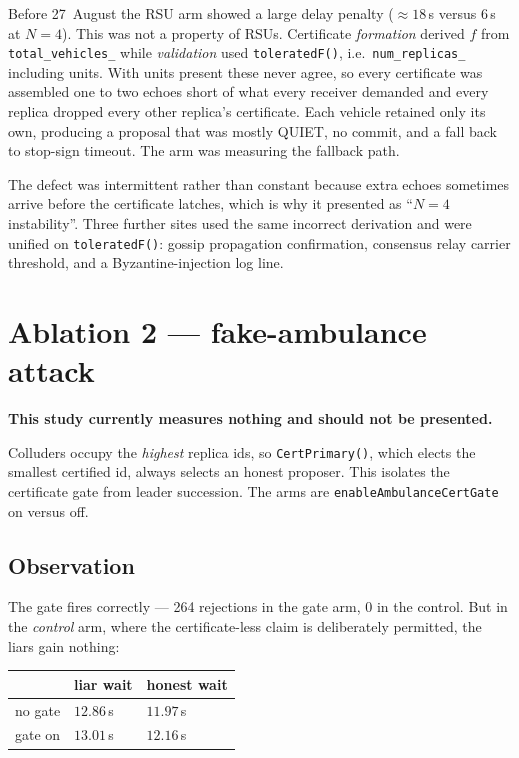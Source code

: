 \documentclass[11pt,a4paper]{article}
\newcommand{\code}[1]{\texttt{\small #1}}
\newcommand{\caveat}[1]{\textcolor{red!60!black}{\textbf{#1}}}
\begin{document}
Before 27~August the RSU arm showed a large delay penalty (${\approx}18$\,s
versus $6$\,s at $N{=}4$). This was not a property of RSUs. Certificate
\emph{formation} derived $f$ from \code{total\_vehicles\_} while
\emph{validation} used \code{toleratedF()}, i.e.\ \code{num\_replicas\_}
including units. With units present these never agree, so every certificate was
assembled one to two echoes short of what every receiver demanded and every
replica dropped every other replica's certificate. Each vehicle retained only
its own, producing a proposal that was mostly QUIET, no commit, and a fall back
to stop-sign timeout. The arm was measuring the fallback path.

The defect was intermittent rather than constant because extra echoes sometimes
arrive before the certificate latches, which is why it presented as ``$N{=}4$
instability''. Three further sites used the same incorrect derivation and were
unified on \code{toleratedF()}: gossip propagation confirmation, consensus relay
carrier threshold, and a Byzantine-injection log line.

\section{Ablation 2 --- fake-ambulance attack}

\caveat{This study currently measures nothing and should not be presented.}

Colluders occupy the \emph{highest} replica ids, so \code{CertPrimary()}, which
elects the smallest certified id, always selects an honest proposer. This
isolates the certificate gate from leader succession. The arms are
\code{enableAmbulanceCertGate} on versus off.

\subsection*{Observation}

The gate fires correctly --- 264 rejections in the gate arm, 0 in the control.
But in the \emph{control} arm, where the certificate-less claim is deliberately
permitted, the liars gain nothing:

\begin{center}
\begin{tabular}{lll}
\toprule
& liar wait & honest wait \\
\midrule
no gate  & $12.86$\,s & $11.97$\,s \\
gate on  & $13.01$\,s & $12.16$\,s \\
\bottomrule
\end{tabular}
\end{center}
\end{document}
